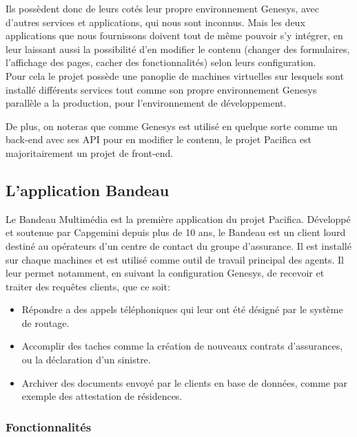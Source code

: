 \documentclass{rapport}
\begin{document}
Ils possèdent donc de leurs cotés leur propre environnement Genesys, avec d'autres services et applications, qui nous sont inconnus. Mais les deux applications que nous fournissons doivent tout de même pouvoir s'y intégrer, en leur laissant aussi la possibilité d'en modifier le contenu (changer des formulaires, l'affichage des pages, cacher des fonctionnalités) selon leurs configuration.\\
Pour cela le projet possède une panoplie de machines virtuelles sur lesquels sont installé différents services tout comme son propre environnement Genesys parallèle a la production, pour l'environnement de développement.

De plus, on noteras que comme Genesys est utilisé en quelque sorte comme un back-end avec ses API pour en modifier le contenu, le projet Pacifica est majoritairement un projet de front-end.\\

\subsection{L'application Bandeau}

Le Bandeau Multimédia est la première application du projet Pacifica. Développé et soutenue par Capgemini depuis plus de 10 ans, le Bandeau est un client lourd destiné au opérateurs d'un centre de contact du groupe d'assurance. Il est installé sur chaque machines et est utilisé comme outil de travail principal des agents. Il leur permet notamment, en suivant la configuration Genesys, de recevoir et traiter des requêtes clients, que ce soit:\\

\begin{itemize}
\item Répondre a des appels téléphoniques qui leur ont été désigné par le système de routage.
\item Accomplir des taches comme la création de nouveaux contrats d'assurances, ou la déclaration d'un sinistre.
\item Archiver des documents envoyé par le clients en base de données, comme par exemple des attestation de résidences.
\end{itemize}

\subsubsection{Fonctionnalités}
\end{document}
